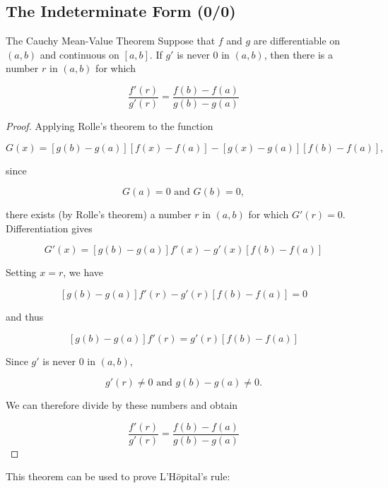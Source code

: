     \subsection{The Indeterminate Form (0/0)}       %

        \begin{theorem}{The Cauchy Mean-Value Theorem}
            Suppose that $f$ and $g$ are differentiable on $(a,b)$ and continuous on $[a,b]$. If $g'$ is never 0 in $(a,b)$, then there is a number $r$ in $(a,b)$ for which

            \[
                \frac{f'(r)}{g'(r)} = \frac{f(b) - f(a)}{g(b) - g(a)}
            \]
        \end{theorem}

        \begin{proof}
            Applying Rolle's theorem to the function

            \[
                G(x) = [g(b) - g(a)][f(x) - f(a)] - [g(x) - g(a)][f(b) - f(a)],
            \]

            since

            \[
                G(a) = 0 \text{ and } G(b) = 0,
            \]

            there exists (by Rolle's theorem) a number $r$ in $(a,b)$ for which $G'(r) = 0$. Differentiation gives

            \[
                G'(x) = [g(b) - g(a)] f'(x) - g'(x) [f(b) - f(a)]
            \]

            Setting $x = r$, we have

            \[
                [g(b) - g(a)] f'(r) - g'(r) [f(b) - f(a)] = 0
            \]

            and thus

            \[
                [g(b) - g(a)] f'(r) = g'(r) [f(b) - f(a)]
            \]

            Since $g'$ is never 0 in $(a,b)$,

            \[
                g'(r) \not = 0 \text{ and } g(b) - g(a) \not = 0.
            \]

            We can therefore divide by these numbers and obtain

            \[
                \frac{f'(r)}{g'(r)} = \frac{f(b) - f(a)}{g(b) - g(a)}
            \]
        \end{proof}

        This theorem can be used to prove L'H$\hat{o}$pital's rule:


